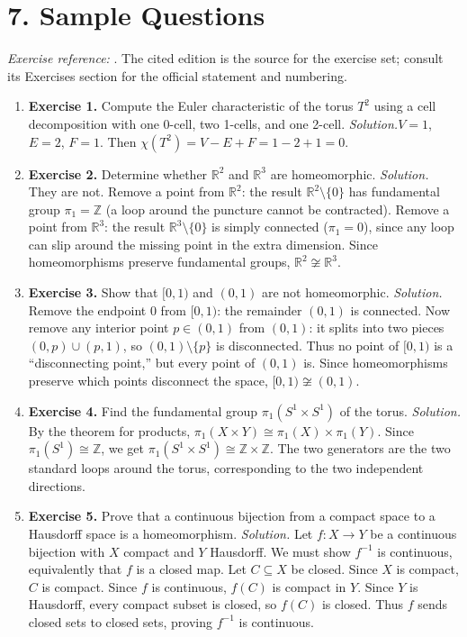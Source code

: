 \section*{7. Sample Questions}
\emph{Exercise reference:} \cite{topology_ref1}. The cited edition is the source for the exercise set; consult its Exercises section for the official statement and numbering.
\begin{enumerate}[leftmargin=*,itemsep=0.9em]
\item \textbf{Exercise 1.} Compute the Euler characteristic of the torus $T^2$ using a cell decomposition with one 0-cell, two 1-cells, and one 2-cell. \emph{Solution.}$V = 1$, $E = 2$, $F = 1$. Then $\chi(T^2) = V - E + F = 1 - 2 + 1 = 0$.

\item \textbf{Exercise 2.} Determine whether $\mathbb{R}^2$ and $\mathbb{R}^3$ are homeomorphic. \emph{Solution.} They are not. Remove a point from $\mathbb{R}^2$: the result $\mathbb{R}^2\setminus\{0\}$ has fundamental group $\pi_1=\mathbb{Z}$ (a loop around the puncture cannot be contracted). Remove a point from $\mathbb{R}^3$: the result $\mathbb{R}^3\setminus\{0\}$ is simply connected ($\pi_1=0$), since any loop can slip around the missing point in the extra dimension. Since homeomorphisms preserve fundamental groups, $\mathbb{R}^2\not\cong\mathbb{R}^3$.

\item \textbf{Exercise 3.} Show that $[0,1)$ and $(0,1)$ are not homeomorphic. \emph{Solution.} Remove the endpoint $0$ from $[0,1)$: the remainder $(0,1)$ is connected. Now remove any interior point $p\in(0,1)$ from $(0,1)$: it splits into two pieces $(0,p)\cup(p,1)$, so $(0,1)\setminus\{p\}$ is disconnected. Thus no point of $[0,1)$ is a ``disconnecting point,'' but every point of $(0,1)$ is. Since homeomorphisms preserve which points disconnect the space, $[0,1)\not\cong(0,1)$.

\item \textbf{Exercise 4.} Find the fundamental group $\pi_1(S^1 \times S^1)$ of the torus. \emph{Solution.} By the theorem for products, $\pi_1(X \times Y) \cong \pi_1(X) \times \pi_1(Y)$. Since $\pi_1(S^1) \cong \mathbb{Z}$, we get $\pi_1(S^1 \times S^1) \cong \mathbb{Z} \times \mathbb{Z}$. The two generators are the two standard loops around the torus, corresponding to the two independent directions.

\item \textbf{Exercise 5.} Prove that a continuous bijection from a compact space to a Hausdorff space is a homeomorphism. \emph{Solution.} Let $f\colon X \to Y$ be a continuous bijection with $X$ compact and $Y$ Hausdorff. We must show $f^{-1}$ is continuous, equivalently that $f$ is a closed map. Let $C\subseteq X$ be closed. Since $X$ is compact, $C$ is compact. Since $f$ is continuous, $f(C)$ is compact in $Y$. Since $Y$ is Hausdorff, every compact subset is closed, so $f(C)$ is closed. Thus $f$ sends closed sets to closed sets, proving $f^{-1}$ is continuous.

\end{enumerate}
